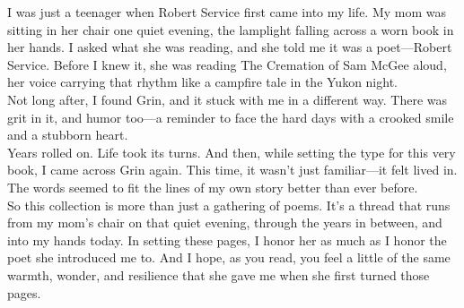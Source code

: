 \vspace{1em}
I was just a teenager when Robert Service first came into my life. My mom was sitting in her chair one quiet evening, the lamplight falling across a worn book in her hands. I asked what she was reading, and she told me it was a poet—Robert Service. Before I knew it, she was reading The Cremation of Sam McGee aloud, her voice carrying that rhythm like a campfire tale in the Yukon night.\\

Not long after, I found Grin, and it stuck with me in a different way. There was grit in it, and humor too—a reminder to face the hard days with a crooked smile and a stubborn heart.\\

Years rolled on. Life took its turns. And then, while setting the type for this very book, I came across Grin again. This time, it wasn’t just familiar—it felt lived in. The words seemed to fit the lines of my own story better than ever before.\\

So this collection is more than just a gathering of poems. It’s a thread that runs from my mom’s chair on that quiet evening, through the years in between, and into my hands today. In setting these pages, I honor her as much as I honor the poet she introduced me to. And I hope, as you read, you feel a little of the same warmth, wonder, and resilience that she gave me when she first turned those pages.
